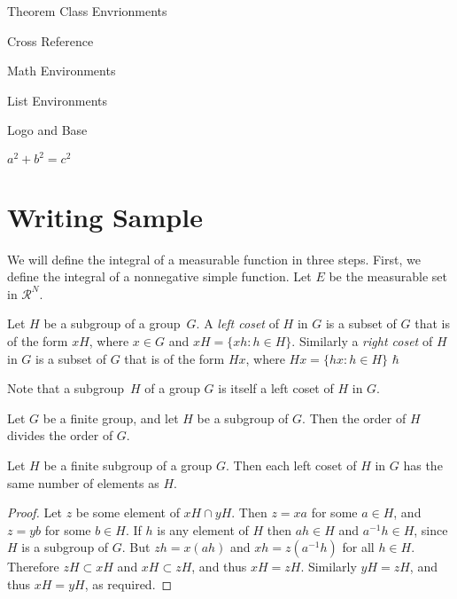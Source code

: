 \begin{introduction}
    \item Theorem Class Envrionments
    \item Cross Reference
    \item Math Environments
    \item List Environments
    \item Logo and Base
    \item $a^2+b^2=c^2$
\end{introduction}


\section{Writing Sample}

We will define the integral of a measurable function in three steps. First, we define the integral of a nonnegative simple function. Let $E$ be the measurable set in $\mathcal{R}^N$.

\begin{definition}
    Let $H$ be a subgroup of a group~$G$. A \emph{left coset} of $H$ in $G$ is a subset of $G$ that is of the form $xH$, where $x \in G$ and $xH = \{ xh : h \in H \}$. Similarly a \emph{right coset} of $H$ in $G$ is a subset of $G$ that is of the form $Hx$, where $Hx = \{ hx : h \in H \}$ $\hbar$
\end{definition}

\begin{note}
    Note that a subgroup~$H$ of a group $G$ is itself a left coset of $H$ in $G$.
\end{note}

\begin{theorem}
    \label{thm:lg}
    Let $G$ be a finite group, and let $H$ be a subgroup of $G$. Then the order of $H$ divides the order of $G$.
\end{theorem}

\begin{proposition}
    Let $H$ be a finite subgroup of a group $G$. Then each left coset of $H$ in $G$ has the same number of elements as $H$.
\end{proposition}

\begin{proof}
    Let $z$ be some element of $xH \cap yH$. Then $z = xa$ for some $a \in H$, and $z = yb$ for some $b \in H$. If $h$ is any element of $H$ then $ah \in H$ and $a^{-1}h \in H$, since $H$ is a subgroup of $G$. But $zh = x(ah)$ and $xh = z(a^{-1}h)$ for all $h \in H$. Therefore $zH \subset xH$ and $xH \subset zH$, and thus $xH = zH$. Similarly $yH = zH$, and thus $xH = yH$, as required.
\end{proof}

